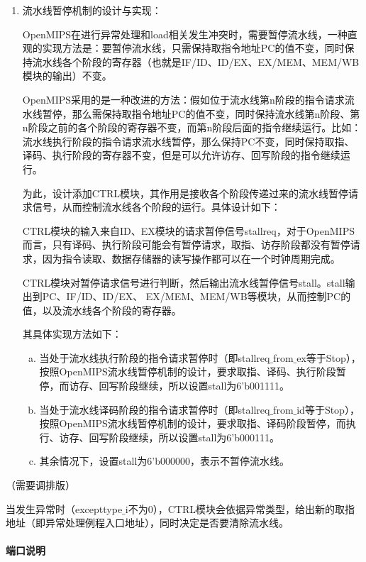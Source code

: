 \begin{enumerate}[(1)]
\item 流水线暂停机制的设计与实现：

	OpenMIPS在进行异常处理和load相关发生冲突时，需要暂停流水线，一种直观的实现方法是：要暂停流水线，只需保持取指令地址PC的值不变，同时保持流水线各个阶段的寄存器（也就是IF/ID、ID/EX、EX/MEM、MEM/WB模块的输出）不变。

	OpenMIPS采用的是一种改进的方法：假如位于流水线第n阶段的指令请求流水线暂停，那么需保持取指令地址PC的值不变，同时保持流水线第n阶段、第n阶段之前的各个阶段的寄存器不变，而第n阶段后面的指令继续运行。比如：流水线执行阶段的指令请求流水线暂停，那么保持PC不变，同时保持取指、译码、执行阶段的寄存器不变，但是可以允许访存、回写阶段的指令继续运行。

	为此，设计添加CTRL模块，其作用是接收各个阶段传递过来的流水线暂停请求信号，从而控制流水线各个阶段的运行。具体设计如下：

	CTRL模块的输入来自ID、EX模块的请求暂停信号stallreq，对于OpenMIPS而言，只有译码、执行阶段可能会有暂停请求，取指、访存阶段都没有暂停请求，因为指令读取、数据存储器的读写操作都可以在一个时钟周期完成。

	CTRL模块对暂停请求信号进行判断，然后输出流水线暂停信号stall。stall输出到PC、IF/ID、ID/EX、 EX/MEM、MEM/WB等模块，从而控制PC的值，以及流水线各个阶段的寄存器。

	其具体实现方法如下：
	\begin{enumerate}[(a)]
		\item 当处于流水线执行阶段的指令请求暂停时（即stallreq$\_$from$\_$ex等于Stop），按照OpenMIPS流水线暂停机制的设计，要求取指、译码、执行阶段暂停，而访存、回写阶段继续，所以设置stall为6'b001111。
	
		\item 当处于流水线译码阶段的指令请求暂停时（即stallreq$\_$from$\_$id等于Stop），按照OpenMIPS流水线暂停机制的设计，要求取指、译码阶段暂停，而执行、访存、回写阶段继续，所以设置stall为6'b000111。
	
		\item 其余情况下，设置stall为6'b000000，表示不暂停流水线。
	\end{enumerate}
\end{enumerate}

（需要调排版）

当发生异常时（excepttype$\_$i不为0），CTRL模块会依据异常类型，给出新的取指地址（即异常处理例程入口地址），同时决定是否要清除流水线。



\paragraph{端口说明}
\quad

